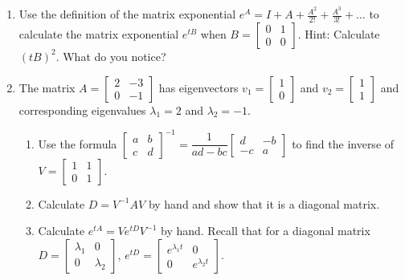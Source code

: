 \documentclass[10pt]{article}
\begin{document}
\newpage

\begin{enumerate}
\setcounter{enumi}{\theenumCount}


\item Use the definition of the matrix exponential $e^A = I + A + \tfrac{A^2}{2!} + \tfrac{A^3}{3!} + \ldots $ to calculate the matrix exponential $e^{tB}$ when $B = \begin{bmatrix} 0 & 1 \\ 0 & 0 \end{bmatrix}$.  Hint: Calculate $(tB)^2$.  What do you notice?   
\vfill

\item The matrix $A = \begin{bmatrix} 2 & -3 \\ 0 & -1 \end{bmatrix}$ has eigenvectors $v_1 = \begin{bmatrix} 1 \\ 0 \end{bmatrix}$ and $v_2 = \begin{bmatrix} 1 \\ 1 \end{bmatrix}$ and corresponding eigenvalues $\lambda_1 = 2$ and $\lambda_2 = -1$.  
\begin{enumerate}
\item Use the formula $\begin{bmatrix} a & b \\ c & d \end{bmatrix}^{-1} = \dfrac{1}{ad - bc} \begin{bmatrix} d & -b \\ -c & a \end{bmatrix}$ to find the inverse of $V = \begin{bmatrix} 1 & 1 \\ 0 & 1 \end{bmatrix}$. 
\vfill

\item Calculate $D = V^{-1} A V$ by hand and show that it is a diagonal matrix.
\vfill

\item Calculate $e^{tA} = V e^{tD} V^{-1}$ by hand.  Recall that for a diagonal matrix $D = \begin{bmatrix} \lambda_1 & 0 \\ 0 & \lambda_2 \end{bmatrix}$, $e^{tD} = \begin{bmatrix} e^{\lambda_1 t} & 0 \\ 0 & e^{\lambda_2 t} \end{bmatrix}$.
\vfill
\end{enumerate}



\end{enumerate}
\end{document}

